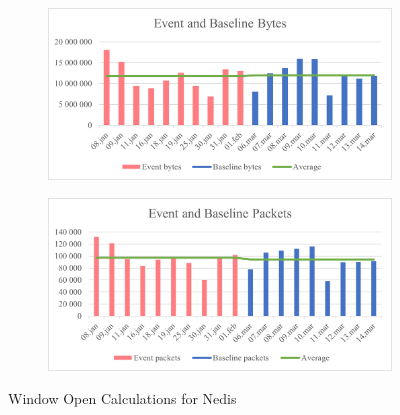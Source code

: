 \begin{figure}[H]
    \centering
    \begin{subfigure}{1\textwidth}
        \centering
        \includegraphics[width=1\hsize]{figures/Nedis_Window_Calculations_Bytes.png} 
    \end{subfigure}
    \begin{subfigure}{1\textwidth}
        \centering
        \includegraphics[width=1\hsize]{figures/Nedis_Window_Calculations_Packets.png} 
    \end{subfigure}
    \caption{Window Open Calculations for Nedis}
    \label{fig:NedisWindowCalculations}
\end{figure}

